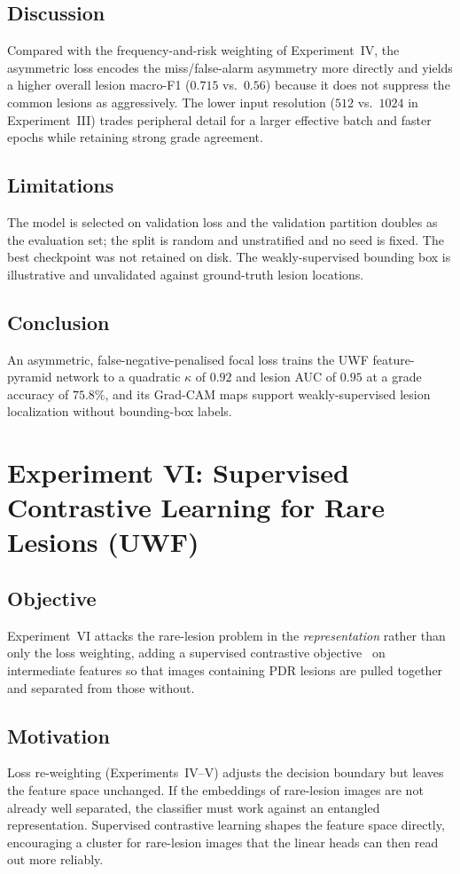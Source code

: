 \documentclass[journal,twoside,web]{ieeecolor}
\begin{document}
\subsection{Discussion}
Compared with the frequency-and-risk weighting of Experiment~IV, the asymmetric
loss encodes the miss/false-alarm asymmetry more directly and yields a higher
overall lesion macro-F1 ($0.715$ vs.\ $0.56$) because it does not suppress the
common lesions as aggressively. The lower input resolution ($512$ vs.\ $1024$ in
Experiment~III) trades peripheral detail for a larger effective batch and faster
epochs while retaining strong grade agreement.

\subsection{Limitations}
The model is selected on validation loss and the validation partition doubles as the
evaluation set; the split is random and unstratified and no seed is fixed. The
best checkpoint was not retained on disk. The weakly-supervised bounding box is
illustrative and unvalidated against ground-truth lesion locations.

\subsection{Conclusion}
An asymmetric, false-negative-penalised focal loss trains the UWF feature-pyramid
network to a quadratic $\kappa$ of $0.92$ and lesion AUC of $0.95$ at a grade
accuracy of $75.8\%$, and its Grad-CAM maps support weakly-supervised lesion
localization without bounding-box labels.

\section{Experiment VI: Supervised Contrastive Learning for Rare Lesions (UWF)}
\label{sec:exp6}

\subsection{Objective}
Experiment~VI attacks the rare-lesion problem in the \emph{representation} rather
than only the loss weighting, adding a supervised contrastive
objective~\cite{supcon} on intermediate features so that images containing PDR
lesions are pulled together and separated from those without.

\subsection{Motivation}
Loss re-weighting (Experiments~IV--V) adjusts the decision boundary but leaves the
feature space unchanged. If the embeddings of rare-lesion images are not already
well separated, the classifier must work against an entangled representation.
Supervised contrastive learning shapes the feature space directly, encouraging a
cluster for rare-lesion images that the linear heads can then read out more
reliably.
\end{document}
